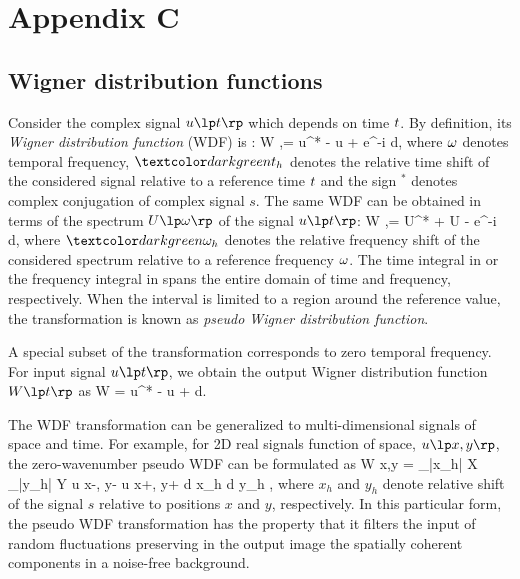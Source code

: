 \appendix
\section{Appendix C}
\subsection{Wigner distribution functions}

Consider the complex signal $u\lp \tm \rp$ which depends on time
${t}$. By definition, its {\it Wigner distribution function} (WDF)
is \cite[]{Wigner.wdf}:
%
\beq \label{eqn:wigt}
W   \lp \tm,\wm \rp =  \int
u^* \lp \tm- \rp
u   \lp \tm+ \rp 
e^{-i\; \wm \; \th} 
d\th \;,
\eeq
%
where ${\omega}$ denotes temporal frequency, $\th$ denotes the relative
time shift of the considered signal relative to a reference time ${t}$
and the sign $^*$ denotes complex conjugation of complex signal $s$.
The same WDF can be obtained in terms of the spectrum $U\lp \wm \rp$
of the signal $u\lp \tm \rp$:
%
\beq \label{eqn:wigw}
W   \lp \tm,\wm \rp =  \int
U^* \lp \wm+ \rp
U   \lp \wm- \rp 
e^{-i\; \tm \; \wh} 
d\wh \;,
\eeq
%
where $\wh$ denotes the relative frequency shift of the considered
spectrum relative to a reference frequency ${\omega}$.  The time integral
in  or the frequency integral in  spans the entire
domain of time and frequency, respectively. When the interval is
limited to a region around the reference value, the transformation is
known as {\it pseudo Wigner distribution function}.

A special subset of the transformation  corresponds to zero
temporal frequency. For input signal $u\lp \tm \rp$, we obtain the
output Wigner distribution function $W\lp \tm \rp$ as
%
\beq \label{eqn:wigto}
W   \lp \tm \rp =  \int
u^* \lp \tm- \rp
u   \lp \tm+ \rp 
d\th \;.
\eeq

The WDF transformation can be generalized to multi-dimensional signals
of space and time. For example, for 2D real signals function of space,
$u\lp x,y\rp$, the zero-wavenumber pseudo WDF can be formulated as
%
\beq \label{eqn:wigxy}
W \lp x,y \rp =  
\int\limits_{|x_h| \le X} 
\int\limits_{|y_h| \le Y}
u   \lp x-, y- \rp
u   \lp x+, y+ \rp 
d x_h d y_h \;,
\eeq
where $x_h$ and $y_h$ denote relative shift of the signal $s$ relative
to positions $x$ and $y$, respectively. In this particular form, the
pseudo WDF transformation has the property that it filters the input
of random fluctuations preserving in the output image the spatially
coherent components in a noise-free background.

